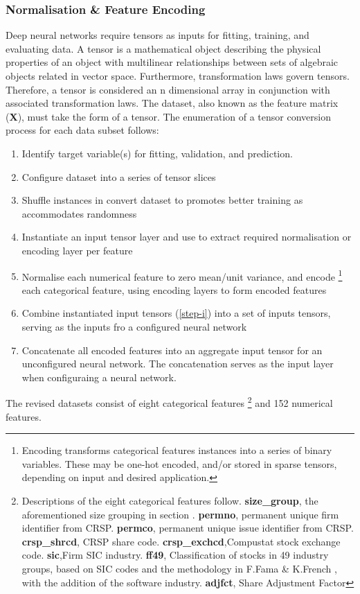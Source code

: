 \documentclass[12pt]{article}
\begin{document}
\subsubsection{Normalisation \& Feature Encoding}
Deep neural networks require tensors as inputs for fitting, training, and evaluating data.
A tensor is a mathematical object describing the physical properties of an object with multilinear relationships between sets of algebraic objects related in vector space.
Furthermore, transformation laws govern tensors. 
Therefore, a tensor is considered an n dimensional array in conjunction with associated transformation laws.
The dataset, also known as the feature matrix (\textbf{X}), must take the form of a tensor.
The enumeration of a tensor conversion process for each data subset follows:
\singlespacing
\begin{enumerate} 
\item Identify target variable(s) for fitting, validation, and prediction.
\item Configure dataset into a series of tensor slices
\item Shuffle instances in convert dataset to promotes better training as accommodates randomness
\item Instantiate an input tensor layer and use to extract required normalisation or encoding layer per feature \label{step-i}
\item Normalise each numerical feature to zero mean/unit variance, and encode 
\footnote{Encoding transforms categorical features instances into a series of binary variables.
These may be one-hot encoded, and/or stored in sparse tensors, depending on input and desired application.} 
each categorical feature, using encoding layers to form encoded features
\item Combine instantiated input tensors (\ref{step-i}) into a set of inputs tensors, serving as the inputs fro a configured neural network
\item Concatenate all encoded features into an aggregate input tensor for an unconfigured neural network. 
The concatenation serves as the input layer when configuraing a neural network.
\end{enumerate}
\doublespacing
The revised datasets consist of eight categorical features
\footnote{Descriptions of the eight categorical features follow. 
\textbf{size\_group}, the aforementioned size grouping in section \label{data-processing}. 
\textbf{permno}, permanent unique firm identifier from CRSP.
\textbf{permco}, permanent unique issue identifier from CRSP.
\textbf{crsp\_shrcd}, CRSP share code.
\textbf{crsp\_exchcd},Compustat stock exchange code.
\textbf{sic},Firm SIC industry.
\textbf{ff49}, Classification of stocks in 49 industry groups, based on SIC codes and the methodology in F.Fama \& K.French \citeyear{fama1997industry}, with the addition of the software industry.
\textbf{adjfct}, Share Adjustment Factor}
and 152 numerical features.
\end{document}
